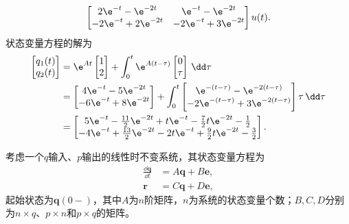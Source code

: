 \begin{example}
\begin{align}
\begin{bmatrix}
            2\e^{-t}-\e^{-2t} & \e^{-t}-\e^{-2t}\\
            -2\e^{-t}+2\e^{-2t} & -2\e^{-t}+3\e^{-2t}
        \end{bmatrix}u(t).
    \end{align}
    状态变量方程的解为
    \begin{align}
        \begin{bmatrix}
            q_1(t)\\
            q_2(t)
        \end{bmatrix}&=\e^{At}\begin{bmatrix}
            1\\
            2
        \end{bmatrix}+\int_0^{t}\e^{A(t-\tau)}\begin{bmatrix}
            0\\
            \tau
        \end{bmatrix}\,\dd\tau\nonumber\\
        &=\begin{bmatrix}
            4\e^{-t}-5\e^{-2t}\\
            -6\e^{-t}+8\e^{-2t}
        \end{bmatrix}+\int_0^{t}\begin{bmatrix}
            \e^{-(t-\tau)}-\e^{-2(t-\tau)}\\
            -2\e^{-(t-\tau)}+3\e^{-2(t-\tau)}
        \end{bmatrix}\tau\,\dd\tau\nonumber\\
        &=\begin{bmatrix}
            5\e^{-t}-\frac{11}{2}\e^{-2t}+t\e^{-t}-\frac{7}{2}t\e^{-2t}-\frac{1}{2}\\
            -4\e^{-t}+\frac{13}{2}\e^{-2t}-2t\e^{-t}+\frac{9}{2}t\e^{-2t}-\frac{3}{2}
        \end{bmatrix}.
    \end{align}
\end{example}

考虑一个$q$输入、$p$输出的线性时不变系统，其状态变量方程为
\begin{align}
    \frac{\dd\mathbf{q}}{\dd t}&=A\mathbf{q}+B\mathbf{e},\\
    \mathbf{r}&=C\mathbf{q}+D\mathbf{e},
\end{align}
起始状态为$\mathbf{q}(0-)$，其中$A$为$n$阶矩阵，$n$为系统的状态变量个数；$B,C,D$分别为$n\times q$、$p\times n$和$p\times q$的矩阵。

